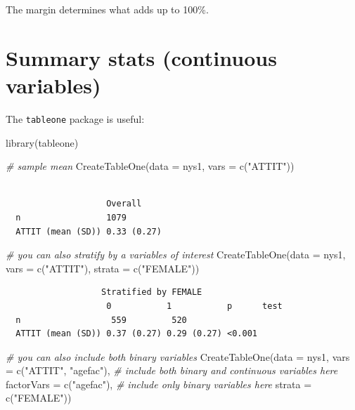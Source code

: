 \documentclass[
  letterpaper,
  DIV=11,
  numbers=noendperiod]{scrreprt}
\newenvironment{Shaded}{\begin{snugshade}}{\end{snugshade}}
\newcommand{\AttributeTok}[1]{\textcolor[rgb]{0.49,0.56,0.16}{#1}}
\newcommand{\CommentTok}[1]{\textcolor[rgb]{0.38,0.63,0.69}{\textit{#1}}}
\newcommand{\FunctionTok}[1]{\textcolor[rgb]{0.02,0.16,0.49}{#1}}
\newcommand{\NormalTok}[1]{\textcolor[rgb]{0.00,0.44,0.13}{#1}}
\newcommand{\StringTok}[1]{\textcolor[rgb]{0.25,0.44,0.63}{#1}}
\begin{document}
The margin determines what adds up to 100\%.

\hypertarget{summary-stats-continuous-variables}{%
\section{Summary stats (continuous
variables)}\label{summary-stats-continuous-variables}}

The \texttt{tableone} package is useful:

\begin{Shaded}
\begin{Highlighting}[]
  \FunctionTok{library}\NormalTok{(tableone)}
  
\CommentTok{\# sample mean  }
  \FunctionTok{CreateTableOne}\NormalTok{(}\AttributeTok{data =}\NormalTok{ nys1,}
                 \AttributeTok{vars =} \FunctionTok{c}\NormalTok{(}\StringTok{"ATTIT"}\NormalTok{))}
\end{Highlighting}
\end{Shaded}

\begin{verbatim}
                   
                    Overall    
  n                 1079       
  ATTIT (mean (SD)) 0.33 (0.27)
\end{verbatim}

\begin{Shaded}
\begin{Highlighting}[]
\CommentTok{\# you can also stratify by a variables of interest}
  \FunctionTok{CreateTableOne}\NormalTok{(}\AttributeTok{data =}\NormalTok{ nys1,}
                 \AttributeTok{vars =} \FunctionTok{c}\NormalTok{(}\StringTok{"ATTIT"}\NormalTok{), }
                 \AttributeTok{strata =} \FunctionTok{c}\NormalTok{(}\StringTok{"FEMALE"}\NormalTok{))}
\end{Highlighting}
\end{Shaded}

\begin{verbatim}
                   Stratified by FEMALE
                    0           1           p      test
  n                  559         520                   
  ATTIT (mean (SD)) 0.37 (0.27) 0.29 (0.27) <0.001     
\end{verbatim}

\begin{Shaded}
\begin{Highlighting}[]
\CommentTok{\# you can also include both binary variables}
  \FunctionTok{CreateTableOne}\NormalTok{(}\AttributeTok{data =}\NormalTok{ nys1, }
                 \AttributeTok{vars =} \FunctionTok{c}\NormalTok{(}\StringTok{"ATTIT"}\NormalTok{, }\StringTok{"agefac"}\NormalTok{),  }\CommentTok{\# include both binary and continuous variables here}
                 \AttributeTok{factorVars =} \FunctionTok{c}\NormalTok{(}\StringTok{"agefac"}\NormalTok{), }\CommentTok{\# include only binary variables here}
                 \AttributeTok{strata =} \FunctionTok{c}\NormalTok{(}\StringTok{"FEMALE"}\NormalTok{))}
\end{Highlighting}
\end{Shaded}
\end{document}
